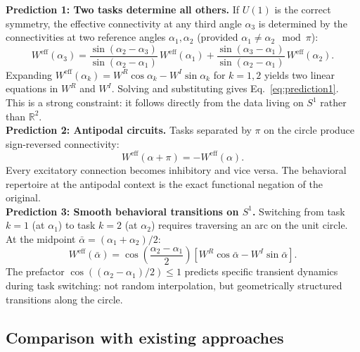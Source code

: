 \documentclass[11pt,a4paper]{article}
\newcommand{\R}{\mathbb{R}}
\newcommand{\Weff}{W^{\text{eff}}}
\begin{document}
{\textbf{Prediction 1: Two tasks determine all others.}
If $U(1)$ is the correct symmetry, the effective connectivity at any third angle $\alpha_3$ is determined by the connectivities at two reference angles $\alpha_1, \alpha_2$ (provided $\alpha_1 \neq \alpha_2 \mod \pi$):
\begin{equation}
\boxed{\Weff(\alpha_3) = \frac{\sin(\alpha_2 - \alpha_3)}{\sin(\alpha_2 - \alpha_1)}\,\Weff(\alpha_1) + \frac{\sin(\alpha_3 - \alpha_1)}{\sin(\alpha_2 - \alpha_1)}\,\Weff(\alpha_2).}
\label{eq:prediction1}
\end{equation}
Expanding $\Weff(\alpha_k) = W^R\cos\alpha_k - W^I\sin\alpha_k$ for $k=1,2$ yields two linear equations in $W^R$ and $W^I$. Solving and substituting gives Eq.~\eqref{eq:prediction1}. This is a strong constraint: it follows directly from the data living on $S^1$ rather than $\R^2$.
\\
\textbf{Prediction 2: Antipodal circuits.}
Tasks separated by $\pi$ on the circle produce sign-reversed connectivity:
\begin{equation}
\Weff(\alpha + \pi) = -\Weff(\alpha).
\label{eq:antipodal}
\end{equation}
Every excitatory connection becomes inhibitory and vice versa. The behavioral repertoire at the antipodal context is the exact functional negation of the original.
\\
\textbf{Prediction 3: Smooth behavioral transitions on $S^1$.}
Switching from task $k=1$ (at $\alpha_1$) to task $k=2$ (at $\alpha_2$) requires traversing an arc on the unit circle. At the midpoint $\bar{\alpha} = (\alpha_1 + \alpha_2)/2$:
\begin{equation}
\Weff(\bar{\alpha}) = \cos\!\left(\frac{\alpha_2 - \alpha_1}{2}\right)\left[W^R\cos\bar{\alpha} - W^I\sin\bar{\alpha}\right].
\label{eq:midpoint}
\end{equation}
The prefactor $\cos((\alpha_2-\alpha_1)/2) \leq 1$ predicts specific transient dynamics during task switching: not random interpolation, but geometrically structured transitions along the circle.


\subsection{Comparison with existing approaches}
\label{sec:comparison}

}
\end{document}
